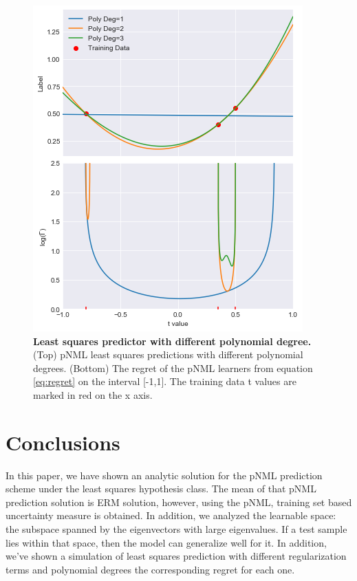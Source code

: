 \documentclass[conference,letterpaper]{IEEEtran}
\begin{document}
\begin{figure}[h]
    \centering
    \includegraphics[width=\linewidth]{figures/least_sqaures_with_poly_degree.jpg}
    \caption{\textbf{Least squares predictor with different polynomial degree.} (Top) pNML least squares predictions with different polynomial degrees. (Bottom) The regret of the pNML learners from equation \ref{eq:regret} on the interval [-1,1]. The training data t values are marked in red on the x axis.}
    \label{fig:least_squares_with_poly}
\end{figure}


\section{Conclusions} \label{sec:conclusion}

In this paper, we have shown an analytic solution for the pNML prediction scheme under the least squares hypothesis class. The mean of that pNML prediction solution is ERM solution, however, using the pNML, training set based uncertainty measure is obtained. In addition, we analyzed the learnable space: the subspace spanned by the eigenvectors with large eigenvalues. If a test sample lies within that space, then the model can generalize well for it. 
In addition, we've shown a simulation of least squares prediction with different regularization terms and polynomial degrees the corresponding regret for each one. 
\end{document}
